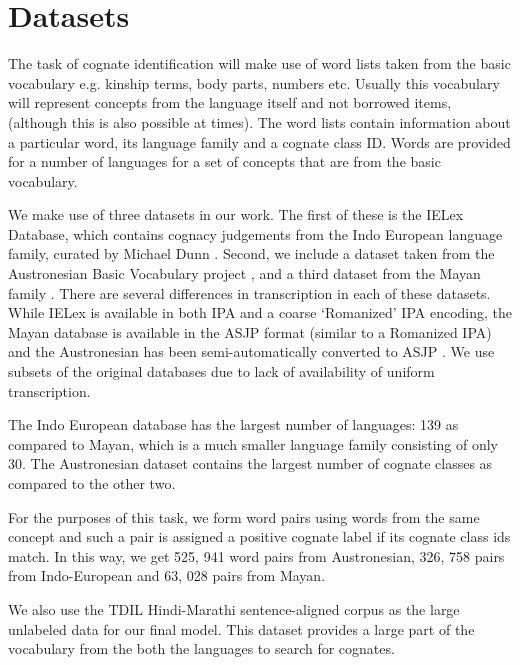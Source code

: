 \documentclass[11pt,letterpaper]{article}
\begin{document}
\section{Datasets}

The task of cognate identification will make use of word lists taken from the basic vocabulary e.g. kinship terms, body parts, numbers etc. Usually this vocabulary will represent concepts from the language itself and not borrowed items, (although this is also possible at times). The word lists contain information about a particular word, its language family and a cognate class ID. Words are provided for a number of languages for a set of concepts that are from the basic vocabulary.

We make use of three datasets in our work. The first of these is the IELex Database, which contains cognacy judgements from the Indo European language family, curated by Michael Dunn . Second, we include a dataset taken from the Austronesian Basic Vocabulary project \cite{greenhillBlust:08}, and a third dataset from the Mayan family \cite{wichmann:2008}. 
There are several differences in transcription in each of these datasets. While IELex is available in both IPA and a coarse `Romanized' IPA encoding, the Mayan database is available in the ASJP format (similar to a Romanized IPA) \cite{Brown:08} and the Austronesian has been semi-automatically converted to ASJP \cite{rama2016siamese}. We use subsets of the original databases due to lack of availability of uniform transcription.

The Indo European database has the largest number of languages: 139 as compared to Mayan, which is a much smaller language family consisting of only 30. The Austronesian dataset contains the largest number of cognate classes as compared to the other two.

For the purposes of this task, we form word pairs using words from the same concept and such a pair is assigned a positive cognate label if its cognate class ids match. In this way, we 
get 525, 941 word pairs from Austronesian, 326, 758 pairs from Indo-European and 63, 028 pairs from Mayan.

We also use the TDIL Hindi-Marathi sentence-aligned corpus as the large unlabeled data for our final model. This dataset provides a large part of the vocabulary from the both the languages to search for cognates.
\end{document}

